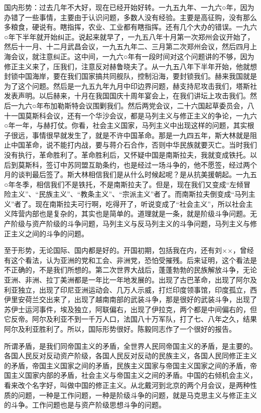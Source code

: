 国内形势：过去几年不大好，现在已经开始好转。一九五九年、一九六○年，因为办错了一些事情，主要由于认识问题，多数人没有经验。主要是高征购，没有那么多粮食，硬说有。瞎指挥，农业、工业都有瞎指挥。还有几个大办的错误。一九六○年下半年就开始纠正。说起来就早了，一九五八年十月第一次郑州会议开始了，然后十一月、十二月武昌会议，一九五九年二、三月第二次郑州会议，然后四月上海会议，就注意纠正。这中间，一九六○年有一段时间对这个问题讲的不够，因为修正主义来了，压我们，注意反对赫鲁晓夫了。从一九五八年下半年开始，他就想封锁中国海岸，要在我们国家搞共同舰队，控制沿海，要封锁我们。赫来我国就是为了这个问题。然后是一九五九年九月中印边界问题，赫支持尼攻击我们，塔斯社发表声明。以后赫来，十月在我国国庆十周年宴会上，在我们讲坛上攻击我们。然后一九六○年布加勒斯特会议围剿我们。然后两党会议，二十六国起草委员会，八十一国莫斯科会议，还有一个华沙会议，都是马列主义与修正主义的争论，一九六○年一年，与赫打仗。你看，社会主义国家，马列主义中出现这样的问题，其实根子很远，事情很早就发生了，就是不许中国革命。那是一九四五年，斯大林就是阻止中国革命，说不能打内战，要与蒋介石合作，否则中华民族就要灭亡。当时我们没有执行，革命胜利了。革命胜利后，又怀疑中国是南斯拉夫，我就变成铁托。以后到莫斯科，签订中苏同盟互助条约，也是经过一场斗争的，他不愿签，经过两个月的谈判最后签了。斯大林相信我们是从什么时候起呢？是从抗美援朝起。一九五○年冬季，相信我们不是铁托，不是南斯拉夫了。但是，现在我们又变成“左倾冒险主义”、“民族主义”、“教条主义”、“宗派主义”者了。而南斯拉夫倒变成“马列主义”者了。现在南斯拉夫可行啊，吃得开了，听说变成了“社会主义”，所以社会主义阵营内部也是复杂的，其实也是简单的。道理就是一条，就是阶级斗争问题。无产阶级与资产阶级的斗争问题，马列主义与反马列主义的斗争问题，马列主义与修正主义之间的斗争的问题。

至于形势，无论国际、国内都是好的。开国初期，包括我在内，还有刘××，曾经有这个看法，认为亚洲的党和工会、非洲党，恐怕受摧残。后来证明，这个看法是不正确的，不是我们所想的。第二次世界大战后，蓬蓬勃勃的民族解放斗争，无论亚洲、非洲、拉丁美洲都是一年比一年地发展的。出现了古巴革命，出现了阿尔及利亚独立，出现了印尼亚洲运动会、几万人示威，打烂印度领事馆，印度孤立，西伊里安荷兰交出来了，出现了越南南部的武装斗争，那是很好的武装斗争，出现了苏伊士运河事件，埃及独立，阿联偏右，出现了伊拉克，两个都是中间偏右的，但它反帝。阿尔及利亚不到一千万人口，法国八十万军队，打了七、八年之久，结果阿尔及利亚胜利了。所以，国际形势很好。陈毅同志作了一个很好的报告。

所谓矛盾，是我们同帝国主义的矛盾，全世界人民同帝国主义的矛盾，是主要的。各国人民反对反动资产阶级，各国人民反对反动的民族主义，各国人民同修正主义的矛盾，帝国主义国家之间的矛盾，民族主义国家与帝国主义国家之间的矛盾，帝国主义国家内部的矛盾，社会主义与帝国主义之间的矛盾。中国的右倾机会主义，看来改个名字好，叫做中国的修正主义。从北戴河到北京的两个月会议，是两种性质的问题，一种是工作问题，一种是阶级斗争的问题，就是马克思主义与修正主义的斗争。工作问题也是与资产阶级思想斗争的问题。

